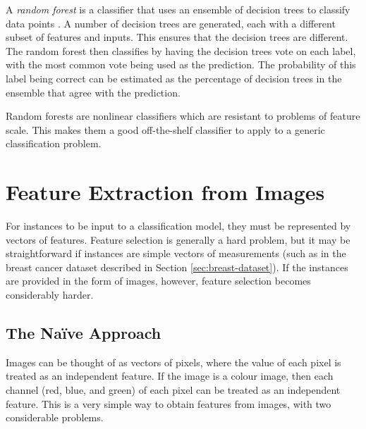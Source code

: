         A \emph{random forest} is a classifier that uses an ensemble of decision
        trees to classify data points \citep{kon16}. A number of decision trees
        are generated, each with a different subset of features and inputs. This
        ensures that the decision trees are different. The random forest then
        classifies by having the decision trees vote on each label, with the
        most common vote being used as the prediction. The probability of this
        label being correct can be estimated as the percentage of decision trees
        in the ensemble that agree with the prediction.

        Random forests are nonlinear classifiers which are resistant to problems of feature scale. This makes them a good off-the-shelf classifier to apply to a generic classification problem.

\section{Feature Extraction from Images}
\label{sec:image-feature-extraction}
    
    For instances to be input to a classification model, they must be
    represented by vectors of features. Feature selection is generally a hard
    problem, but it may be straightforward if instances are simple vectors of
    measurements (such as in the breast cancer dataset described in Section
    \ref{sec:breast-dataset}). If the instances are provided in the form of
    images, however, feature selection becomes considerably harder.

    \subsection{The Na\"ive Approach}
    \label{sec:naive-approach-image-features}

        Images can be thought of as vectors of pixels, where the value of each
        pixel is treated as an independent feature. If the image is a colour
        image, then each channel (red, blue, and green) of each pixel can be
        treated as an independent feature. This is a very simple way to obtain
        features from images, with two considerable problems.

